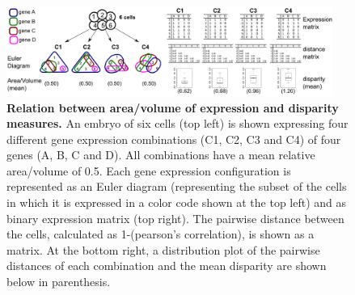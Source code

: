 \begin{figure}[h]
  \includegraphics[width=0.95\textwidth]{./Images/measures_relations.png}
  \centering
  \caption{\textbf{Relation between area/volume of expression and disparity measures.} An embryo of six cells (top left) is shown expressing four different gene expression combinations (C1, C2, C3 and C4) of four genes (A, B, C and D). All combinations have a mean relative area/volume of 0.5. Each gene expression configuration is represented as an Euler diagram (representing the subset of the cells in which it is expressed in a color code shown at the top left) and as binary expression matrix (top right). The pairwise distance between the cells, calculated as 1-(pearson's correlation), is shown as a matrix. At the bottom right, a distribution plot of the pairwise distances of each combination and the mean disparity are shown below in parenthesis.
 }
  \label{fig:measures_relations}
\end{figure}
